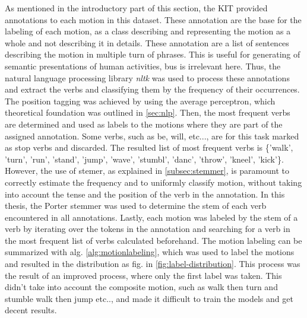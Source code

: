 			As mentioned in the introductory part of this section, the KIT provided annotations to each motion in this dataset. These annotation are the base for the labeling of each motion, as a class describing and representing the motion as a whole and not describing it in details. These annotation are a list of sentences describing the motion in multiple turn of phrases. This is useful for generating of semantic presentations of human activities, bus is irrelevant here. Thus, the natural language processing library \textit{nltk} was used to process these annotations and extract the verbs and classifying them by the frequency of their occurrences. The position tagging was achieved by using the average perceptron, which theoretical foundation was outlined in \ref{sec:nlp}. Then, the most frequent verbs are determined and used as labels to the motions where they are part of the assigned annotation. Some verbs, such as be, will, etc..., are for this task marked as stop verbs and discarded. The resulted list of most frequent verbs is \{'walk', 'turn', 'run', 'stand', 'jump', 'wave', 'stumbl', 'danc', 'throw', 'kneel', 'kick'\}. However, the use of stemer, as explained in \ref{subsec:stemmer}, is paramount to correctly estimate the frequency and to uniformly classify motion, without taking into account the tense and the position of the verb in the annotation. In this thesis, the Porter stemmer was used to determine the stem of each verb encountered in all annotations. Lastly, each motion was labeled by the stem of a verb by iterating over the tokens in the annotation and searching for a verb in the most frequent list of verbs calculated beforehand. The motion labeling can be summarized with alg. \ref{alg:motionlabeling}, which was used to label the motions and resulted in the distribution as fig. in \ref{fig:label-distribution}. This process was the result of an improved process, where only the first label was taken. This didn't take into account the composite motion, such as walk then turn and stumble walk then jump etc.., and made it difficult to train the models and get decent results.\newline
